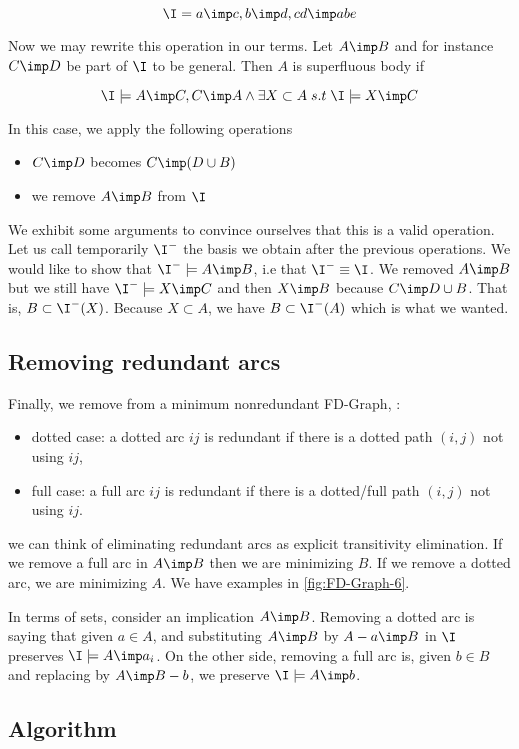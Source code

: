 \[ \I = {a \imp c, b \imp d, cd \imp abe} \] 

\noindent Now we may rewrite this operation in our terms. Let $A \imp B$ and 
for instance $C \imp D$ be part of $\I$ to be general. Then $A$ is superfluous
body if

\[ \I \models A \imp C, C \imp A \land \exists X \subset A \; s.t \;
\I \models X \imp C \]

\noindent In this case, we apply the following operations
\begin{itemize}
	\item $C \imp D$ becomes $C \imp (D \cup B)$
	\item we remove $A \imp B$ from $\I$
\end{itemize}

\noindent We exhibit some arguments to convince ourselves that this is a valid
operation. Let us call temporarily $\I^{-}$ the basis we obtain after the 
previous operations. We would like to show that $\I^{-} \models A \imp B$, i.e
that $\I^{-} \equiv \I$. We removed $A \imp B$ but we still have $\I^{-} \models
X \imp C$ and then $X \imp B$ because $C \imp D \cup B$. That is, $B \subset 
\I^{-}(X)$. Because $X \subset A$, we have $B \subset \I^{-}(A)$ which is what
we wanted. 


\subsection{Removing redundant arcs}

Finally, we remove from a minimum nonredundant FD-Graph, :
\begin{itemize}
	\item dotted case: a dotted arc $ij$ is redundant if there is a dotted 
	path $(i, j)$ not using $ij$,
	\item full case: a full arc $ij$ is redundant if there is a dotted/full 
	path $(i, j)$ not using $ij$.
\end{itemize}

\noindent we can think of eliminating redundant arcs as explicit transitivity
elimination. If we remove a full arc in $A \imp B$ then we are minimizing $B$.
If we remove a dotted arc, we are minimizing $A$. We have examples in 
\ref{fig:FD-Graph-6}. 



In terms of sets, consider an implication $A \imp B$. Removing a dotted arc is
saying that given $a \in A$, and substituting $A \imp B$ by $A - a \imp B$ in
$\I$ preserves $\I \models A \imp a_i$. On the other side, removing a full arc
is, given $b \in B$ and replacing by $A \imp B - b$, we preserve $\I \models 
A \imp b$.

\subsection{Algorithm}

